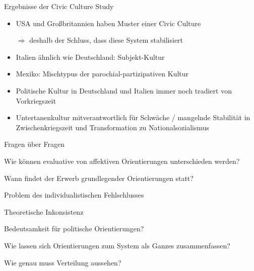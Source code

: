 \documentclass[11pt]{beamer}
\begin{document}
\begin{frame}[t]{Ergebnisse der Civic Culture Study}
	\begin{itemize}
		\item USA und Großbritannien haben Muster einer Civic Culture \pause
		\item[$\Rightarrow$] deshalb der Schluss, dass diese System stabilisiert  \pause
		\item Italien ähnlich wie Deutschland: Subjekt-Kultur
		\item Mexiko: Mischtypus der parochial-partizipativen Kultur \pause
	\end{itemize}

	\begin{itemize}
		\item Politische Kultur in Deutschland und Italien immer noch tradiert von Vorkriegszeit \pause
		\item Untertanenkultur mitverantwortlich für Schwäche / mangelnde Stabilität in Zwischenkriegszeit und Transformation zu Nationalsozialismus
	\end{itemize}
\end{frame}

\begin{frame}{Fragen über Fragen}
	\begin{nolist}
		\item Wie können evaluative von affektiven Orientierungen unterschieden werden?
		\item Wann findet der Erwerb grundlegender Orientierungen statt?
		\item Problem des individualistischen Fehlschlusses
		\item Theoretische Inkonsistenz
		\item Bedeutsamkeit für politische Orientierungen?
		\item Wie lassen sich Orientierungen zum System als Ganzes zusammenfassen? 
		\item Wie genau muss Verteilung aussehen?
	\end{nolist}
\end{frame}

\end{document}
